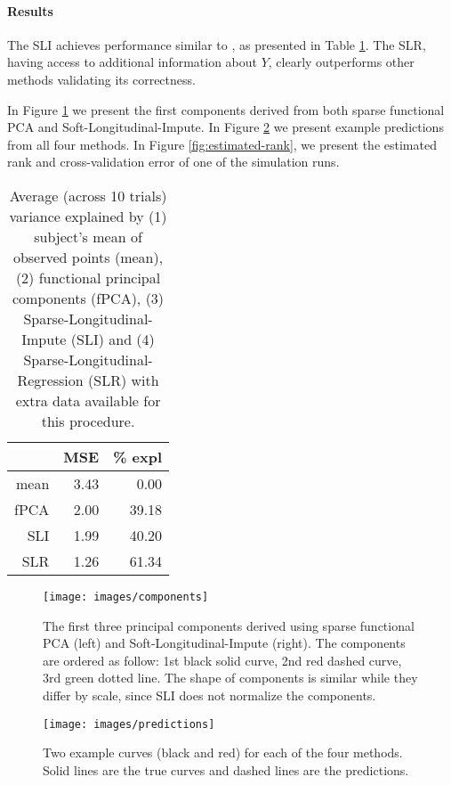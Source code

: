 \documentclass[preprint]{imsart}
\numberwithin{equation}{section}
\theoremstyle{plain}
\begin{document}
\paragraph{Results}

The SLI achieves performance similar to \citep{james2000principal}, as presented in Table \ref{tbl:simulations}. The SLR, having access to additional information about $Y$, clearly outperforms other methods validating its correctness.

In Figure \ref{fig:principal-components} we present the first components derived from both sparse functional PCA and Soft-Longitudinal-Impute. In Figure \ref{fig:example-predictions} we present example predictions from all four methods. In Figure \ref{fig:estimated-rank}, we present the estimated rank and cross-validation error of one of the simulation runs.

\begin{table}[ht]
\centering
\begin{tabular}{rrr}
  \hline
 & MSE & \% expl \\ 
  \hline
  mean & 3.43 & 0.00 \\ 
  fPCA & 2.00 & 39.18 \\ 
  SLI & 1.99 & 40.20 \\ 
  SLR & 1.26 & 61.34 \\ 
   \hline
\end{tabular}\label{tbl:simulations}
\caption{Average (across 10 trials) variance explained by (1) subject's mean of observed points (mean), (2) functional principal components (fPCA), (3) Sparse-Longitudinal-Impute (SLI) and (4) Sparse-Longitudinal-Regression (SLR) with extra data available for this procedure.}
\end{table}

\begin{figure}[h!]
  \texttt{[image: images/components]}
  \caption{The first three principal components derived using sparse functional PCA (left) and Soft-Longitudinal-Impute (right). The components are ordered as follow: 1st black solid curve, 2nd red dashed curve, 3rd green dotted line. The shape of components is similar while they differ by scale, since SLI does not normalize the components.}
  \label{fig:principal-components}
\end{figure}

\begin{figure}[h!]
  \texttt{[image: images/predictions]}
  \caption{Two example curves (black and red) for each of the four methods. Solid lines are the true curves and dashed lines are the predictions. }
  \label{fig:example-predictions}
\end{figure}
\end{document}
